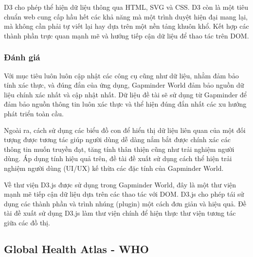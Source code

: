 \documentclass[12pt,a4paper]{article}
\begin{document}
D3 cho phép thể hiện dữ liệu thông qua HTML, SVG và CSS. D3 còn là một tiêu chuẩn web cung cấp hầu hết các khả năng mà một trình duyệt hiện đại mang lại, mà không cần phải tự viết lại hay dựa trên một nền tảng khuôn khổ. Kết hợp các thành phần trực quan mạnh mẽ và hướng tiếp cận dữ liệu để thao tác trên DOM.

\subsubsection{Đánh giá}
Với mục tiêu luôn luôn cập nhật các công cụ cũng như dữ liệu, nhằm đảm bảo tính xác thực, và đúng đắn của ứng dụng, Gapminder World đảm bảo nguồn dữ liệu chính xác nhất và cập nhật nhất.
Dữ liệu đề tài sẽ sử dụng từ Gapminder để đảm bảo nguồn thông tin luôn xác thực và thể hiện đúng đắn nhất các xu hướng phát triển toàn cầu.

Ngoài ra, cách sử dụng các biểu đồ con để hiển thị dữ liệu liên quan của một đối tượng được tương tác giúp người dùng dễ dàng nắm bắt được chính xác các thông tin muốn truyền đạt, tăng tính thân thiện cũng như trải nghiệm người dùng. Áp dụng tính hiệu quả trên, đề tài đề xuất sử dụng cách thể hiện trải nghiệm người dùng (UI/UX) kế thừa các đặc tính của Gapminder World. 

Về thư viện D3.js được sử dụng trong Gapminder World, đây là một thư viện mạnh mẽ tiếp cận dữ liệu dựa trên các thao tác với DOM. D3.js cho phép tái sử dụng các thành phần và trình nhúng (plugin) một cách đơn giản và hiệu quả. Đề tài đề xuất sử dụng D3.js làm thư viện chính để hiện thực thư viện tương tác giữa các đồ thị.

\subsection{Global Health Atlas - WHO}
\end{document}
